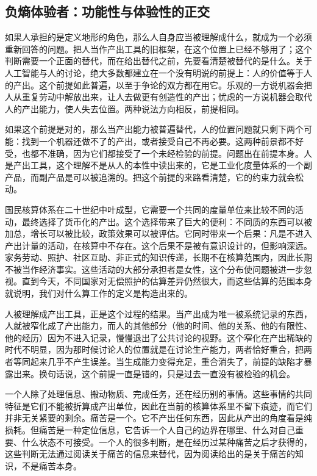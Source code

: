 \subsection{负熵体验者：功能性与体验性的正交}


如果人承担的是定义地形的角色，那么人自身应当被理解成什么，就成为一个必须重新回答的问题。把人当作产出工具的旧框架，在这个位置上已经不够用了；这个判断需要一个正面的替代，而在给出替代之前，先要看清楚被替代的是什么。关于人工智能与人的讨论，绝大多数都建立在一个没有明说的前提上：人的价值等于人的产出。这个前提如此普遍，以至于争论的双方都在用它。乐观的一方说机器会把人从重复劳动中解放出来，让人去做更有创造性的产出；忧虑的一方说机器会取代人的产出能力，使人失去位置。两种说法方向相反，前提相同。

如果这个前提是对的，那么当产出能力被普遍替代，人的位置问题就只剩下两个可能：找到一个机器还做不了的产出，或者接受自己不再必要。这两种前景都不好受，也都不准确，因为它们都接受了一个未经检验的前提。问题出在前提本身。人是产出工具，这个理解不是从人的本性中读出来的，它是工业化度量体系的一个副产品，而副产品是可以被追溯的。把这个前提的来路看清楚，它的约束力就会松动。


国民核算体系在二十世纪中叶成型，它需要一个共同的度量单位来比较不同的活动，最终选择了货币化的产出。这个选择带来了巨大的便利：不同质的东西可以被加总，增长可以被比较，政策效果可以被评估。它同时带来一个后果：凡是不进入产出计量的活动，在核算中不存在。这个后果不是被有意识设计的，但影响深远。家务劳动、照护、社区互助、非正式的知识传递，长期不在核算范围内，因此长期不被当作经济事实。这些活动的大部分承担者是女性，这个分布使问题被进一步忽视。直到今天，不同国家对无偿照护的估算差异仍然很大，而这些估算的范围本身就说明，我们对什么算工作的定义是构造出来的。

人被理解成产出工具，正是这个过程的结果。当产出成为唯一被系统记录的东西，人就被窄化成了产出能力，而人的其他部分（他的时间、他的关系、他的有限性、他的经历）因为不进入记录，慢慢退出了公共讨论的视野。这个窄化在产出稀缺的时代不明显，因为那时候讨论人的位置就是在讨论生产能力，两者恰好重合，把两者等同起来几乎不产生误差。当生成能力变得充足，重合消失了，前提的缺陷才暴露出来。换句话说，这个前提一直是错的，只是过去一直没有被检验的机会。


一个人除了处理信息、搬动物质、完成任务，还在经历别的事情。这些事情的共同特征是它们不能被折算成产出单位，因此在当前的核算体系里不留下痕迹，而它们并非无关紧要的剩余。痛苦是一个。它不产出任何东西，因此从产出的角度看是纯损耗。但痛苦是一种定位信息，它告诉一个人自己的边界在哪里、什么对自己重要、什么状态不可接受。一个人的很多判断，是在经历过某种痛苦之后才获得的，这些判断无法通过阅读关于痛苦的信息来替代，因为阅读给出的是关于痛苦的知识，不是痛苦本身。

